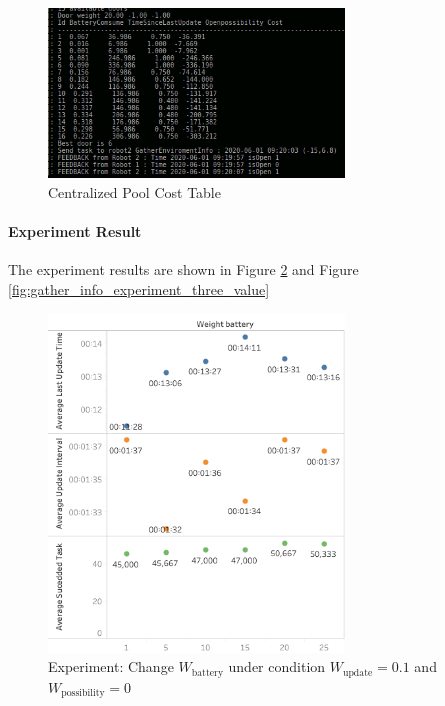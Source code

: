 \begin{figure}[htbp]
    \centering
    \includegraphics[width = 0.7\textwidth]{content/images/ch5/weight_analyze.png}
    \caption{Centralized Pool Cost Table}
    \label{fig:cost_table}
\end{figure}

\paragraph{Experiment Result} The experiment results are shown in Figure \ref{fig:gather_info_experiment_two_value} and Figure \ref{fig:gather_info_experiment_three_value}
\begin{figure}[htbp]
    \centering
    \includegraphics[width = 0.7\textwidth]{content/images/ch5/gather_info_change_weight_battery_only.png}
    \caption{Experiment: Change $W_{\mbox{battery}}$ under condition $W_{\mbox{update}} = 0.1$ and $W_{\mbox{possibility}}=0$}
    \label{fig:gather_info_experiment_two_value}
\end{figure}


